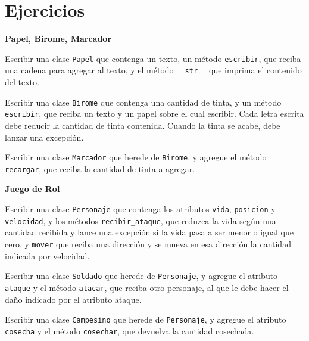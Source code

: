 \newpage
\section{Ejercicios}

\begin{ejercicio}
{\bf Papel, Birome, Marcador}
\begin{partes}
    \item Escribir una clase \verb|Papel| que contenga un texto, un método
\verb|escribir|, que reciba una cadena para agregar al texto, y el método
\verb|__str__| que imprima el contenido del texto.
    \item Escribir una clase \verb|Birome| que contenga una cantidad de tinta, y
un método \verb|escribir|, que reciba un texto y un papel sobre el cual
escribir. Cada letra escrita debe reducir la cantidad de tinta contenida.
Cuando la tinta se acabe, debe lanzar una excepción.
    \item Escribir una clase \verb|Marcador| que herede de \verb|Birome|, y agregue el
método \verb|recargar|, que reciba la cantidad de tinta a agregar.
\end{partes}
\end{ejercicio}


\begin{ejercicio}
{\bf Juego de Rol}
\begin{partes}
    \item Escribir una clase \verb|Personaje| que contenga los atributos
\verb|vida|, \verb|posicion| y \verb|velocidad|, y los métodos
\verb|recibir_ataque|, que reduzca la vida según una cantidad recibida y lance
una excepción si la vida pasa a ser menor o igual que cero, y
\verb|mover| que reciba una dirección y se mueva en esa dirección la cantidad
indicada por velocidad.
    \item Escribir una clase \verb|Soldado| que herede de \verb|Personaje|, y agregue
el atributo \verb|ataque| y el método \verb|atacar|, que reciba otro
personaje, al que le debe hacer el daño indicado por el atributo ataque.
    \item Escribir una clase \verb|Campesino| que herede de \verb|Personaje|, y agregue
el atributo \verb|cosecha| y el método \verb|cosechar|, que devuelva la
cantidad cosechada.
\end{partes}
\end{ejercicio}

